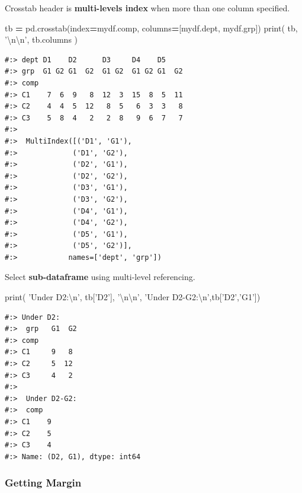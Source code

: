 \documentclass[
]{book}
\newenvironment{Shaded}{\begin{snugshade}}{\end{snugshade}}
\newcommand{\BuiltInTok}[1]{#1}
\newcommand{\CharTok}[1]{\textcolor[rgb]{0.5,0.5,0.5}{#1}}
\newcommand{\NormalTok}[1]{#1}
\newcommand{\OperatorTok}[1]{\textcolor[rgb]{0.43,0.43,0.43}{\textbf{#1}}}
\newcommand{\StringTok}[1]{\textcolor[rgb]{0.5,0.5,0.5}{#1}}
\begin{document}
Crosstab header is \textbf{multi-levels index} when more than one column specified.

\begin{Shaded}
\begin{Highlighting}[]
\NormalTok{tb }\OperatorTok{=}\NormalTok{ pd.crosstab(index}\OperatorTok{=}\NormalTok{mydf.comp, columns}\OperatorTok{=}\NormalTok{[mydf.dept, mydf.grp])}
\BuiltInTok{print}\NormalTok{( tb, }\StringTok{'}\CharTok{\textbackslash{}n\textbackslash{}n}\StringTok{'}\NormalTok{,}
\NormalTok{       tb.columns )}
\end{Highlighting}
\end{Shaded}

\begin{verbatim}
#:> dept D1    D2      D3     D4    D5    
#:> grp  G1 G2 G1  G2  G1 G2  G1 G2 G1  G2
#:> comp                                  
#:> C1    7  6  9   8  12  3  15  8  5  11
#:> C2    4  4  5  12   8  5   6  3  3   8
#:> C3    5  8  4   2   2  8   9  6  7   7 
#:> 
#:>  MultiIndex([('D1', 'G1'),
#:>             ('D1', 'G2'),
#:>             ('D2', 'G1'),
#:>             ('D2', 'G2'),
#:>             ('D3', 'G1'),
#:>             ('D3', 'G2'),
#:>             ('D4', 'G1'),
#:>             ('D4', 'G2'),
#:>             ('D5', 'G1'),
#:>             ('D5', 'G2')],
#:>            names=['dept', 'grp'])
\end{verbatim}

Select \textbf{sub-dataframe} using multi-level referencing.

\begin{Shaded}
\begin{Highlighting}[]
\BuiltInTok{print}\NormalTok{( }\StringTok{'Under D2:}\CharTok{\textbackslash{}n}\StringTok{'}\NormalTok{, tb[}\StringTok{'D2'}\NormalTok{], }\StringTok{'}\CharTok{\textbackslash{}n\textbackslash{}n}\StringTok{'}\NormalTok{,}
       \StringTok{'Under D2-G2:}\CharTok{\textbackslash{}n}\StringTok{'}\NormalTok{,tb[}\StringTok{'D2'}\NormalTok{,}\StringTok{'G1'}\NormalTok{])}
\end{Highlighting}
\end{Shaded}

\begin{verbatim}
#:> Under D2:
#:>  grp   G1  G2
#:> comp        
#:> C1     9   8
#:> C2     5  12
#:> C3     4   2 
#:> 
#:>  Under D2-G2:
#:>  comp
#:> C1    9
#:> C2    5
#:> C3    4
#:> Name: (D2, G1), dtype: int64
\end{verbatim}

\hypertarget{getting-margin}{%
\subsubsection{Getting Margin}\label{getting-margin}}
\end{document}
